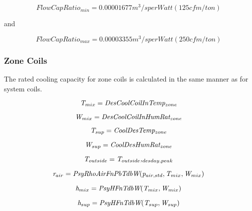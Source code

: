 \begin{equation}
FlowCapRatio_{min} = 0.00001677 m^{3}/s per Watt (125 cfm/ton)
\end{equation}

and

\begin{equation}
FlowCapRatio_{max} = 0.00003355 m^{3}/s per Watt (250 cfm/ton)
\end{equation}

\subsubsection{Zone Coils}\label{zone-coils-5}

The rated cooling capacity for zone coils is calculated in the same manner as for system coils.

\begin{equation}
\emph{T\(_{mix}\)} = \emph{DesCoolCoilInTemp\(_{zone}\)}
\end{equation}

\begin{equation}
\emph{W\(_{mix}\)} = \emph{DesCoolCoilInHumRat\(_{zone}\)}
\end{equation}

\begin{equation}
\emph{T\(_{sup}\)} = \emph{CoolDesTemp\(_{zone}\)}
\end{equation}

\begin{equation}
\emph{W\(_{sup}\)} = \emph{CoolDesHumRat\(_{zone}\)}
\end{equation}

\begin{equation}
\emph{T\(_{outside}\)} = \emph{T\(_{outside}\),\(_{desday,peak}\)}
\end{equation}

\begin{equation}
\emph{r\(_{air}\)} = \emph{PsyRhoAirFnPbTdbW}(\emph{p\(_{air,std}\)}, \emph{T\(_{mix}\)},\emph{W\(_{mix}\)})
\end{equation}

\begin{equation}
\emph{h\(_{mix}\)} = \emph{PsyHFnTdbW}(\emph{T\(_{mix}\)},\emph{W\(_{mix}\)})
\end{equation}

\begin{equation}
\emph{h\(_{sup}\)} = \emph{PsyHFnTdbW}(\emph{T\(_{sup}\)},\emph{W\(_{sup}\)})
\end{equation}


